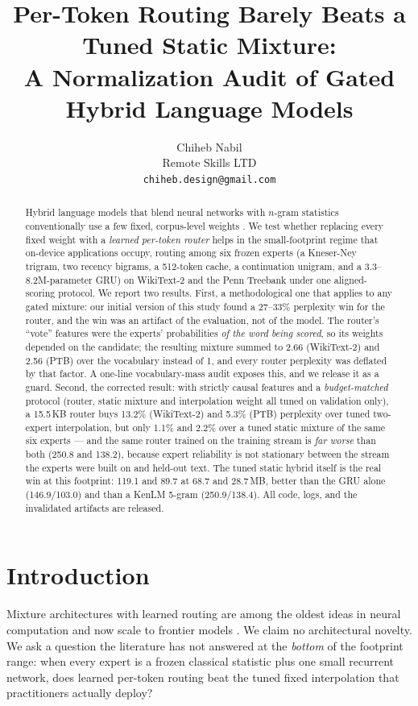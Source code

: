 \documentclass[11pt]{article}
\title{Per-Token Routing Barely Beats a Tuned Static Mixture:\\
A Normalization Audit of Gated Hybrid Language Models}
\author{Chiheb Nabil \\
  Remote Skills LTD \\
  \texttt{chiheb.design@gmail.com}}
\begin{document}
\maketitle

\begin{abstract}
Hybrid language models that blend neural networks with $n$-gram statistics
conventionally use a few fixed, corpus-level weights
\cite{mikolov2011,sundermeyer2012}. We test whether replacing every fixed
weight with a \emph{learned per-token router} helps in the small-footprint
regime that on-device applications occupy, routing among six frozen experts (a
Kneser-Ney trigram, two recency bigrams, a 512-token cache, a continuation
unigram, and a 3.3--8.2M-parameter GRU) on WikiText-2 and the Penn Treebank
under one aligned-scoring protocol. We report two results. First, a
methodological one that applies to any gated mixture: our initial version of
this study found a 27--33\% perplexity win for the router, and the win was an
artifact of the evaluation, not of the model. The router's
``vote'' features were the experts' probabilities \emph{of the word being
scored}, so its weights depended on the candidate; the resulting mixture summed
to 2.66 (WikiText-2) and 2.56 (PTB) over the vocabulary instead of 1, and every
router perplexity was deflated by that factor. A one-line vocabulary-mass audit exposes
this, and we release it as a guard. Second, the corrected result: with strictly causal
features and a \emph{budget-matched} protocol (router, static mixture and
interpolation weight all tuned on validation only), a 15.5\,KB router buys
13.2\% (WikiText-2) and 5.3\% (PTB) perplexity over tuned two-expert
interpolation, but only 1.1\% and 2.2\% over a tuned static mixture of the
same six experts --- and the same router trained on the training stream is
\emph{far worse} than both (250.8 and 138.2), because expert reliability is
not stationary between the stream the experts were built on and held-out text.
The tuned static hybrid itself is the real win at this footprint: 119.1 and
89.7 at 68.7 and 28.7\,MB, better than the GRU alone (146.9/103.0) and than a
KenLM 5-gram (250.9/138.4). All code, logs, and the invalidated artifacts are
released.
\end{abstract}

\section{Introduction}

Mixture architectures with learned routing are among the oldest ideas in neural
computation \cite{jacobs1991,jordan1994} and now scale to frontier models
\cite{shazeer2017}. We claim no architectural novelty. We ask a question the
literature has not answered at the \emph{bottom} of the footprint range: when
every expert is a frozen classical statistic plus one small recurrent network,
does learned per-token routing beat the tuned fixed interpolation that
practitioners actually deploy?
\end{document}
